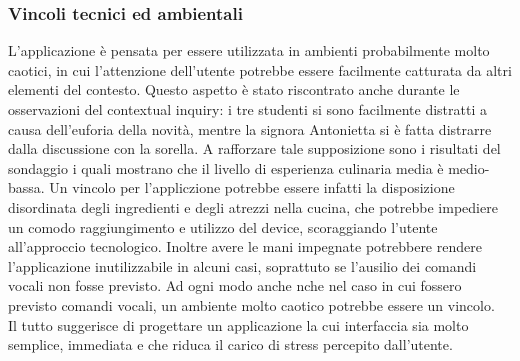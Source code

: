 \subsubsection{Vincoli tecnici ed ambientali}
L'applicazione è pensata per essere utilizzata in ambienti probabilmente
molto caotici, in cui l'attenzione dell'utente potrebbe essere
facilmente catturata da altri elementi del contesto. Questo aspetto è
stato riscontrato anche durante le osservazioni del contextual inquiry:
i tre studenti si sono facilmente distratti a causa dell'euforia della
novità, mentre la signora Antonietta si è fatta distrarre dalla
discussione con la sorella. A rafforzare tale supposizione sono i
risultati del sondaggio i quali mostrano che il livello di esperienza
culinaria media è medio-bassa.
Un vincolo per l'appliczione
potrebbe essere infatti la disposizione disordinata degli ingredienti
e degli atrezzi nella cucina, che potrebbe impediere un comodo
raggiungimento e utilizzo del
device, scoraggiando l'utente all'approccio tecnologico. Inoltre
avere le mani impegnate potrebbere rendere l'applicazione inutilizzabile
in alcuni casi, soprattuto se l'ausilio dei comandi vocali non fosse
previsto. Ad ogni modo anche nche nel caso in cui fossero previsto comandi vocali,
un ambiente molto caotico potrebbe essere un vincolo.\\
Il tutto suggerisce di progettare un applicazione la cui interfaccia sia
molto semplice, immediata e che riduca il carico di stress
percepito dall'utente.

